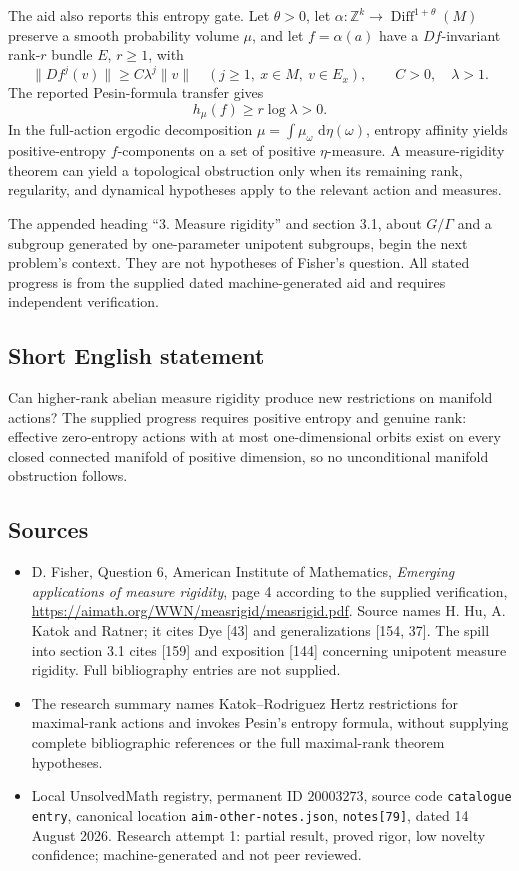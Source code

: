 \documentclass[11pt]{article}
\newcommand{\Z}{\mathbb{Z}}
\newcommand{\dd}{\,\mathrm{d}}
\begin{document}
The aid also reports this entropy gate. Let $\theta>0$, let $\alpha:\Z^k\to\operatorname{Diff}^{1+\theta}(M)$ preserve a smooth probability volume $\mu$, and let $f=\alpha(a)$ have a $Df$-invariant rank-$r$ bundle $E$, $r\ge1$, with
\[
 \|Df^j(v)\|\ge C\lambda^j\|v\|
 \quad(j\ge1,\ x\in M,\ v\in E_x),
 \qquad C>0,\quad\lambda>1.
\]
The reported Pesin-formula transfer gives
\[
 h_\mu(f)\ge r\log\lambda>0.
\]
In the full-action ergodic decomposition $\mu=\int\mu_\omega\,\dd\eta(\omega)$, entropy affinity yields positive-entropy $f$-components on a set of positive $\eta$-measure. A measure-rigidity theorem can yield a topological obstruction only when its remaining rank, regularity, and dynamical hypotheses apply to the relevant action and measures.

The appended heading ``3. Measure rigidity'' and section 3.1, about $G/\Gamma$ and a subgroup generated by one-parameter unipotent subgroups, begin the next problem's context. They are not hypotheses of Fisher's question. All stated progress is from the supplied dated machine-generated aid and requires independent verification.
\subsection{Short English statement}
Can higher-rank abelian measure rigidity produce new restrictions on manifold actions? The supplied progress requires positive entropy and genuine rank: effective zero-entropy actions with at most one-dimensional orbits exist on every closed connected manifold of positive dimension, so no unconditional manifold obstruction follows.
\subsection{Sources}
\begin{itemize}
\item D. Fisher, Question 6, American Institute of Mathematics, \emph{Emerging applications of measure rigidity}, page 4 according to the supplied verification, \url{https://aimath.org/WWN/measrigid/measrigid.pdf}. Source names H. Hu, A. Katok and Ratner; it cites Dye [43] and generalizations [154, 37]. The spill into section 3.1 cites [159] and exposition [144] concerning unipotent measure rigidity. Full bibliography entries are not supplied.
\item The research summary names Katok--Rodriguez Hertz restrictions for maximal-rank actions and invokes Pesin's entropy formula, without supplying complete bibliographic references or the full maximal-rank theorem hypotheses.
\item Local UnsolvedMath registry, permanent ID $20003273$, source code \texttt{catalogue entry}, canonical location \texttt{aim-other-notes.json}, \texttt{notes[79]}, dated 14 August 2026. Research attempt 1: partial result, proved rigor, low novelty confidence; machine-generated and not peer reviewed.
\end{itemize}
\end{document}
